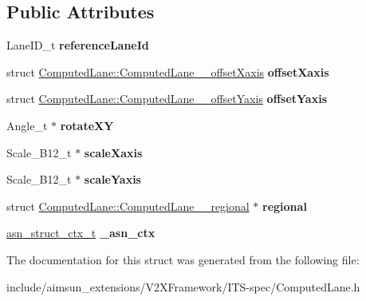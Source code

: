 \subsection*{Public Attributes}
\begin{DoxyCompactItemize}
\item 
Lane\+I\+D\+\_\+t {\bfseries reference\+Lane\+Id}\hypertarget{structComputedLane_a6bed2aeb9e11fdcacdcd30dbc1914c0b}{}\label{structComputedLane_a6bed2aeb9e11fdcacdcd30dbc1914c0b}

\item 
struct \hyperlink{structComputedLane_1_1ComputedLane____offsetXaxis}{Computed\+Lane\+::\+Computed\+Lane\+\_\+\+\_\+offset\+Xaxis} {\bfseries offset\+Xaxis}\hypertarget{structComputedLane_afc8ac4eed711e796ebb52ea10edf07f0}{}\label{structComputedLane_afc8ac4eed711e796ebb52ea10edf07f0}

\item 
struct \hyperlink{structComputedLane_1_1ComputedLane____offsetYaxis}{Computed\+Lane\+::\+Computed\+Lane\+\_\+\+\_\+offset\+Yaxis} {\bfseries offset\+Yaxis}\hypertarget{structComputedLane_a161a05a776c4e6470da7a4ae7d6766bc}{}\label{structComputedLane_a161a05a776c4e6470da7a4ae7d6766bc}

\item 
Angle\+\_\+t $\ast$ {\bfseries rotate\+XY}\hypertarget{structComputedLane_a49753e6dfcbf7a52079ddf3d513a3a97}{}\label{structComputedLane_a49753e6dfcbf7a52079ddf3d513a3a97}

\item 
Scale\+\_\+\+B12\+\_\+t $\ast$ {\bfseries scale\+Xaxis}\hypertarget{structComputedLane_a5744c32d0634e994faa43c176a7e4320}{}\label{structComputedLane_a5744c32d0634e994faa43c176a7e4320}

\item 
Scale\+\_\+\+B12\+\_\+t $\ast$ {\bfseries scale\+Yaxis}\hypertarget{structComputedLane_a5923c691d8c695f2eca4bb7b3bf5f8a2}{}\label{structComputedLane_a5923c691d8c695f2eca4bb7b3bf5f8a2}

\item 
struct \hyperlink{structComputedLane_1_1ComputedLane____regional}{Computed\+Lane\+::\+Computed\+Lane\+\_\+\+\_\+regional} $\ast$ {\bfseries regional}\hypertarget{structComputedLane_a76ea24d60623d4363cbfcb7b82b9de5e}{}\label{structComputedLane_a76ea24d60623d4363cbfcb7b82b9de5e}

\item 
\hyperlink{structasn__struct__ctx__s}{asn\+\_\+struct\+\_\+ctx\+\_\+t} {\bfseries \+\_\+asn\+\_\+ctx}\hypertarget{structComputedLane_a82776cb9fe58ce2d4f698b8f8fd4c3c3}{}\label{structComputedLane_a82776cb9fe58ce2d4f698b8f8fd4c3c3}

\end{DoxyCompactItemize}


The documentation for this struct was generated from the following file\+:\begin{DoxyCompactItemize}
\item 
include/aimsun\+\_\+extensions/\+V2\+X\+Framework/\+I\+T\+S-\/spec/Computed\+Lane.\+h\end{DoxyCompactItemize}
